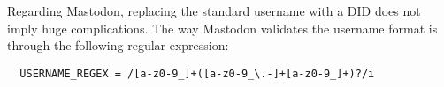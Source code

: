 
Regarding Mastodon, replacing the standard username with a DID does not imply huge complications. The way Mastodon validates the username format is through the following regular expression: 

\begin{verbatim}
  USERNAME_REGEX = /[a-z0-9_]+([a-z0-9_\.-]+[a-z0-9_]+)?/i
\end{verbatim}

